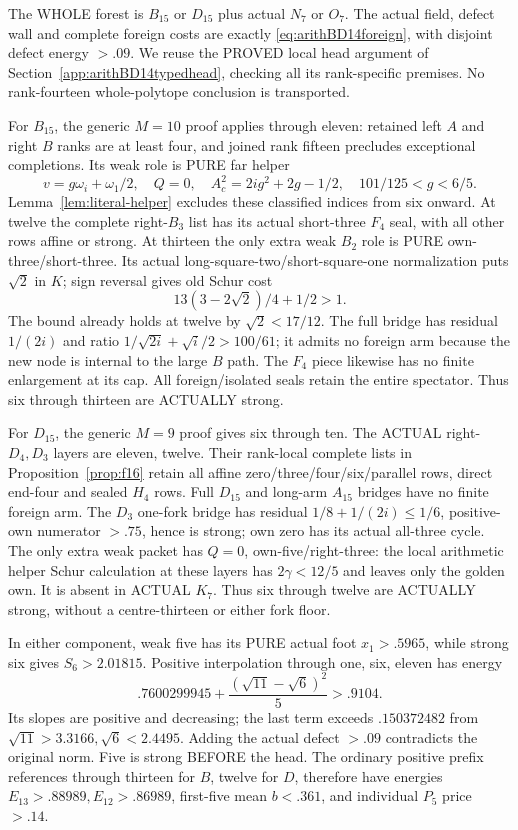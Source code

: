 \documentclass[11pt]{article}
\begin{document}
The WHOLE forest is \(B_{15}\) or \(D_{15}\)
plus actual \(N_7\) or \(O_7\).
The actual field, defect wall and complete
foreign costs are exactly
\eqref{eq:arithBD14foreign}, with disjoint
defect energy \(>.09\).
We reuse the PROVED local head argument
of Section~\ref{app:arithBD14typedhead},
checking all its rank-specific premises.
No rank-fourteen whole-polytope conclusion
is transported.

For \(B_{15}\), the generic \(M=10\)
proof applies through eleven: retained left
\(A\) and right \(B\) ranks are at least
four, and joined rank fifteen precludes
exceptional completions.
Its weak role is PURE far helper
\[
 v=g\omega_i+\omega_1/2,\quad Q=0,\quad
 A_c^2=2ig^2+2g-1/2,\quad101/125<g<6/5 .
\]
Lemma~\ref{lem:literal-helper} excludes
these classified indices from six onward.
At twelve the complete right-\(B_3\)
list has its actual short-three \(F_4\)
seal, with all other rows affine or strong.
At thirteen the only extra weak \(B_2\)
role is PURE own-three/short-three.
Its actual long-square-two/short-square-one
normalization puts \(\sqrt2\) in \(K\);
sign reversal gives old Schur cost
\[
                    13(3-2\sqrt2)/4+1/2>1 .
\]
The bound already holds at twelve by
\(\sqrt2<17/12\).
The full bridge has residual \(1/(2i)\)
and ratio \(1/\sqrt{2i}+\sqrt i/2>100/61\);
it admits no foreign arm because the new
node is internal to the large \(B\) path.
The \(F_4\) piece likewise has no finite
enlargement at its cap.
All foreign/isolated seals retain the
entire spectator.
Thus six through thirteen are ACTUALLY
strong.

For \(D_{15}\), the generic \(M=9\)
proof gives six through ten.
The ACTUAL right-\(D_4,D_3\) layers are
eleven, twelve.
Their rank-local complete lists in
Proposition~\ref{prop:f16} retain all affine
zero/three/four/six/parallel rows, direct
end-four and sealed \(H_4\) rows.
Full \(D_{15}\) and long-arm \(A_{15}\)
bridges have no finite foreign arm.
The \(D_3\) one-fork bridge has residual
\(1/8+1/(2i)\le1/6\), positive-own
numerator \(>.75\), hence is strong;
own zero has its actual all-three cycle.
The only extra weak packet has \(Q=0\),
own-five/right-three: the local arithmetic
helper Schur calculation at these layers
has \(2\gamma<12/5\) and leaves only
the golden own.
It is absent in ACTUAL \(K_7\).
Thus six through twelve are ACTUALLY
strong, without a centre-thirteen or
either fork floor.

In either component, weak five has its
PURE actual foot \(x_1>.5965\), while
strong six gives \(S_6>2.01815\).
Positive interpolation through one,
six, eleven has energy
\[
          .7600299945+{\frac{(\sqrt{11}-\sqrt6)^2}{5}}>.9104 .
\]
Its slopes are positive and decreasing;
the last term exceeds \(.150372482\)
from \(\sqrt{11}>3.3166,\sqrt6<2.4495\).
Adding the actual defect \(>.09\)
contradicts the original norm.
Five is strong BEFORE the head.
The ordinary positive prefix references
through thirteen for \(B\), twelve for
\(D\), therefore have energies
\(E_{13}>.88989,E_{12}>.86989\), first-five
mean \(b<.361\), and individual
\(P_5\) price \(>.14\).
\end{document}
